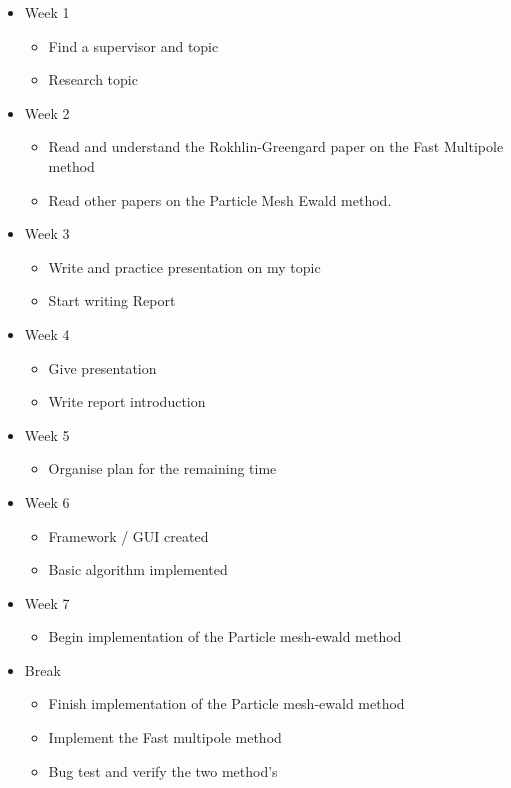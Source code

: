\documentclass[11pt,a4paper,oneside]{article}
\begin{document}
\begin{itemize}
\item Week 1
    \begin{itemize}
    \item Find a supervisor and topic
    \item Research topic
    \end{itemize}
\item Week 2
    \begin{itemize}
    \item Read and understand the Rokhlin-Greengard paper on the Fast Multipole method
    \item Read other papers on the Particle Mesh Ewald method.
    \end{itemize}
\item Week 3
    \begin{itemize}
    \item Write and practice presentation on my topic
    \item Start writing Report
    \end{itemize}
\item Week 4
    \begin{itemize}
    \item Give presentation
    \item Write report introduction
    \end{itemize}
\item Week 5
    \begin{itemize}
    \item Organise plan for the remaining time
    \end{itemize}
\item Week 6
    \begin{itemize}
    \item Framework / GUI created
    \item Basic algorithm implemented
    \end{itemize}
\item Week 7
    \begin{itemize}
    \item Begin implementation of the Particle mesh-ewald method
    \end{itemize}
\item Break
    \begin{itemize}
    \item Finish implementation of the Particle mesh-ewald method
    \item Implement the Fast multipole method
    \item Bug test and verify the two method's

\end{itemize}
\end{itemize}
\end{document}
